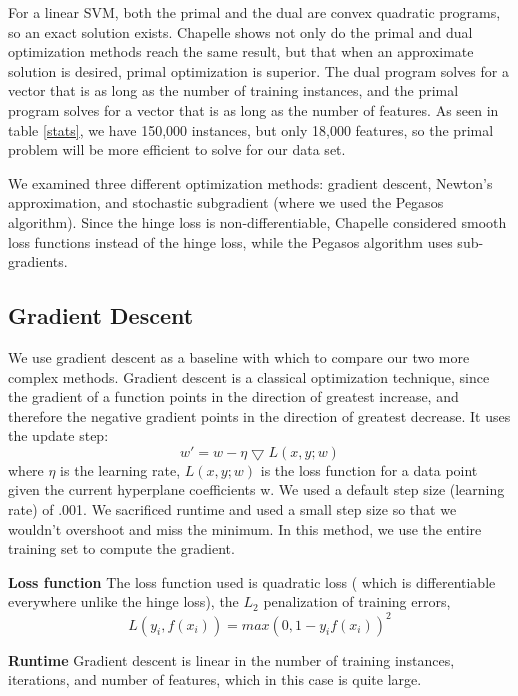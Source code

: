 \documentclass[letterpaper, 11pt]{article}
\begin{document}
For a linear SVM, both the primal and the dual are convex quadratic programs, so an exact solution exists.  Chapelle shows not only do  the primal and dual optimization methods reach the same result, but that when an approximate solution is desired, primal optimization is superior\cite{chapelle2007training}.  The  dual program solves for a vector that is as long as the number of training instances, and the primal program solves for a vector that is as long as the number of features.  As seen in table \ref{stats}, we have 150,000 instances, but only 18,000 features, so the primal problem will be more efficient to solve for our data set.

We examined three different optimization methods: gradient descent, Newton's approximation, and stochastic subgradient (where we used the Pegasos algorithm).  Since the hinge loss is non-differentiable, Chapelle considered smooth loss functions instead of the hinge loss\cite{chapelle2007training}, while the Pegasos algorithm\cite{pegasos} uses sub-gradients.

\subsection{Gradient Descent}

We use gradient descent as a baseline with which to compare our two more complex methods.
Gradient descent is a classical optimization technique, since the gradient of a function points in the direction of greatest increase, and therefore the negative gradient points in the direction of greatest decrease.  It uses the update step:
\begin{equation}
	w' = w - \eta\bigtriangledown L(x,y; w)
\end{equation} 
where $\eta$ is the learning rate, $L(x,y; w)$ is the loss function for a data point given the current hyperplane coefficients w.  We used a default step size (learning rate) of .001.  We sacrificed runtime and  used a small step size so that we wouldn't overshoot and miss the minimum.  In this method, we use the entire training set to compute the gradient.\cite{menon}

\textbf{Loss function} The loss function used is quadratic loss ( which is differentiable everywhere unlike the hinge loss), the $L_2$ penalization of training errors, $$ L(y_i, f(x_i)) = max (0, 1-y_if(x_i))^2 $$

\textbf{Runtime} Gradient descent is linear in the number of training instances, iterations, and number of features, which in this case is quite large.
\end{document}
